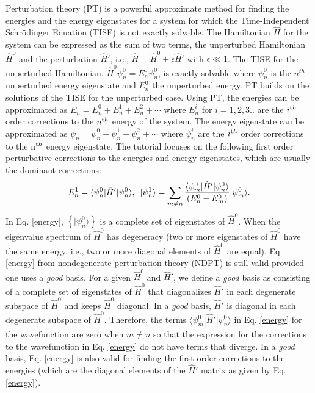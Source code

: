 \documentclass[aps,pra,showpacs,showkeys,twocolumn,groupedaddress]{revtex4-1}
\begin{document}
Perturbation theory (PT) is a powerful approximate method for finding the energies and the energy eigenstates for a system for which the Time-Independent Schr\"{o}dinger Equation (TISE) is not exactly solvable.  The Hamiltonian $\hat{H}$ for the system can be expressed as the sum of two terms, the unperturbed Hamiltonian $\hat{H}^0$ and the perturbation $\hat{H}'$, i.e., $\hat{H}=\hat{H}^0+\epsilon\hat{H}'$ with $\epsilon \ll 1$. The TISE for the unperturbed Hamiltonian, $\hat{H}^0\psi_n^0 = E_n^0\psi_n^0$, is exactly solvable where $\psi_n^0$ is the $n^{th}$ unperturbed energy eigenstate and $E_n^0$ the unperturbed energy.  PT builds on the solutions of the TISE for the unperturbed case.  Using PT, the energies can be approximated as $E_n =E_n^0 + E_n^1+E_n^2 + \cdots$ where $E_n^i$ for $i=1,2,3..$ are the $i^{\textrm th}$ order corrections to the $n^{\textrm th}$ energy of the system.  The energy eigenstate can be approximated as $\psi_n = \psi_n^0+\psi_n^1+\psi_n^2 + \cdots$ where $\psi_n^i$ are the 
 $i^{\textrm th}$ order corrections to the n$^{\textrm th}$ energy eigenstate.  The tutorial focuses on the following first order perturbative corrections to the energies and energy eigenstates, which are usually the dominant corrections:
\begin{equation}\label{energy}
E_n^1 = \langle \psi_n^0|\hat{H}'|\psi_n^0\rangle,\,\,\,
\vspace*{-.16in}
|\psi_n^1\rangle  = \sum_{m \neq n} \frac{\langle \psi_m^0|\hat{H}'|\psi_n^0\rangle }{(E_n^0-E_m^0)}|\psi_m^0\rangle .
\end{equation}
In  Eq. \ref{energy}, $\left\{|\psi_n^0\rangle \right\}$ is a complete set of eigenstates of 
$\hat{H}^0$. 
When the eigenvalue spectrum of $\hat{H}^0$ has degeneracy (two or more eigenstates of $\hat{H}^0$ have the same energy, i.e., two or more diagonal elements of $\hat{H}^0$ are equal), Eq. \ref{energy} from nondegenerate perturbation theory (NDPT) is still valid provided one uses a {\it good} basis.   
For a given $\hat{H}^0$ and $\hat{H}'$, we define a {\it good} basis as consisting of a complete set of eigenstates of $\hat{H}^0$  that diagonalizes $\hat{H}'$ in each degenerate subspace of $\hat{H}^0$ and keeps $\hat{H}^0$ diagonal. In a {\it good} basis, $\hat{H}'$ is diagonal in each degenerate subspace of $\hat{H}^0$. Therefore, the terms $\langle \psi_m^0|\hat{H}'|\psi_n^0\rangle$ in Eq. \ref{energy} for the wavefunction are zero when $m \neq n$ so that the expression for the corrections to the wavefunction in Eq. \ref{energy} do not have terms that diverge.  In a {\it good} basis, Eq. \ref{energy} is also valid for finding the first order corrections to the energies (which are the diagonal elements of the $\hat{H}'$ matrix as given by Eq. \ref{energy}).
\end{document}
